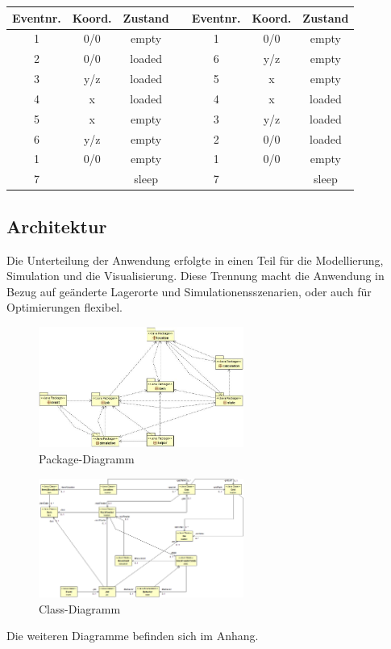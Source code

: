 \begin{table}[H]
  \begin{center}   
    \begin{tabular}{ccc|c|ccc}
		Eventnr.&	Koord.&	Zustand & & Eventnr.&	Koord.&	Zustand\\
		\hline
		1 &			0/0 &	empty & & 1 &			0/0 	&empty\\
		2 &			0/0 &	loaded & & 6 &			y/z 	&empty\\
		3 &			y/z &	loaded & & 5 &			x 		&empty\\
		4 &			x 	&	loaded & & 4 &			x 		&loaded\\
		5 	&		x 	&	empty & & 3 &			y/z 	&loaded\\
		6 	&		y/z &	empty & & 2 &			0/0 	&loaded\\
		1	&		0/0	&	empty & & 1	&		0/0		&empty\\
		7 &					&sleep& & 7 &					&sleep\\
    \end{tabular}
  \end{center}
\end{table}
%	
\subsection{Architektur}
Die Unterteilung der Anwendung erfolgte in einen Teil für die Modellierung, Simulation und die Visualisierung. Diese Trennung macht die Anwendung in Bezug auf geänderte Lagerorte und Simulationensszenarien, oder auch für Optimierungen flexibel.
%
%
\begin{figure}[H]
  \begin{center}
    \includegraphics[width=0.6\textwidth]{images/package_diagramm.png}
    \caption{Package-Diagramm}
    \label{fig:packages}
  \end{center}
\end{figure}
%
\begin{figure}[H]
  \begin{center}
    \includegraphics[width=0.6\textwidth]{images/class_diagramm.png}
    \caption{Class-Diagramm}
    \label{fig:class}
  \end{center}
\end{figure}
%
Die weiteren Diagramme befinden sich im Anhang.


